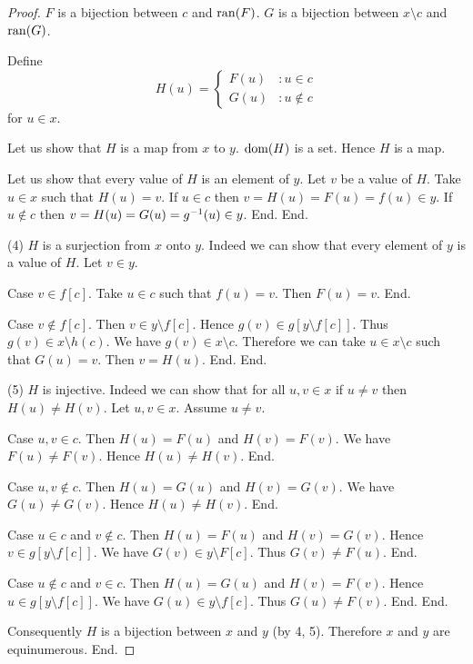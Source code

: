 \documentclass{article}
\begin{document}
\begin{forthel}
\begin{proof}
        $F$ is a bijection between $c$ and $\operatorname{ran}(F)$.
        $G$ is a bijection between $x \setminus c$ and $\operatorname{ran}(G)$.

        Define \[ H(u) =
          \begin{cases}
            F(u) & : u \in c \\
            G(u) & : u \notin c
          \end{cases} \]
        for $u \in x$.

        Let us show that $H$ is a map from $x$ to $y$.
          $\operatorname{dom}(H)$ is a set.
          Hence $H$ is a map.

          Let us show that every value of $H$ is an element of $y$.
            Let $v$ be a value of $H$.
            Take $u \in x$ such that $H(u) = v$.
            If $u \in c$ then $v = H(u) = F(u) = f(u) \in y$.
            If $u \notin c$ then $v = H(u) = G(u) = g^{-1}(u) \in y$.
          End.
        End.

        (4) $H$ is a surjection from $x$  onto $y$.
        Indeed we can show that every element of $y$ is a value of $H$.
          Let $v \in y$.

          Case $v \in f[c]$.
            Take $u \in c$ such that $f(u) = v$.
            Then $F(u) = v$.
          End.

          Case $v \notin f[c]$.
            Then $v \in y \setminus f[c]$.
            Hence $g(v) \in g[y \setminus f[c]]$.
            Thus $g(v) \in x \setminus h(c)$.
            We have $g(v) \in x \setminus c$.
            Therefore we can take $u \in x \setminus c$ such that $G(u) = v$.
            Then $v = H(u)$.
          End.
        End.

        (5) $H$ is injective.
        Indeed we can show that for all $u, v \in x$ if $u \neq v$ then
        $H(u) \neq H(v)$.
          Let $u,v \in x$.
          Assume $u \neq v$.

          Case $u,v \in c$.
            Then $H(u) = F(u)$ and $H(v) = F(v)$.
            We have $F(u) \neq F(v)$.
            Hence $H(u) \neq H(v)$.
          End.

          Case $u,v \notin c$.
            Then $H(u) = G(u)$ and $H(v) = G(v)$.
            We have $G(u) \neq G(v)$.
            Hence $H(u) \neq H(v)$.
          End.

          Case $u \in c$ and $v \notin c$.
            Then $H(u) = F(u)$ and $H(v) = G(v)$.
            Hence $v \in g[y \setminus f[c]]$.
            We have $G(v) \in y \setminus F[c]$.
            Thus $G(v) \neq F(u)$.
          End.

          Case $u \notin c$ and $v \in c$.
            Then $H(u) = G(u)$ and $H(v) = F(v)$.
            Hence $u \in g[y \setminus f[c]]$.
            We have $G(u) \in y \setminus f[c]$.
            Thus $G(u) \neq F(v)$.
          End.
        End.

        Consequently $H$ is a bijection between $x$ and $y$ (by 4, 5).
        Therefore $x$ and $y$ are equinumerous.
      End.
    \end{proof}
  \end{forthel}
\end{document}

